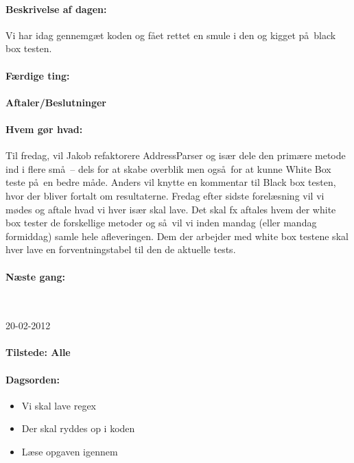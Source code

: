 \documentclass[a4paper,10pt,titlepage]{article}
\begin{document}
			\paragraph{Beskrivelse af dagen:}
			Vi har idag gennemg\ae t koden og f\aa et rettet en smule i den og kigget p\aa \ black box testen.
			
			\paragraph{F\ae rdige ting:}
			
			\paragraph{Aftaler/Beslutninger}
			
			\paragraph{Hvem g\o r hvad:}
			Til fredag, vil Jakob refaktorere AddressParser og is\ae r dele den prim\ae re metode ind i flere sm\aa \ – dels for at skabe overblik men ogs\aa \ for at kunne White Box teste p\aa \ en bedre m\aa de.
Anders vil knytte en kommentar til Black box testen, hvor der bliver fortalt om resultaterne.
Fredag efter sidste forel\ae sning vil vi m\o des og aftale hvad vi hver is\ae r skal lave. Det skal fx aftales hvem der white box tester de forskellige metoder og s\aa \ vil vi inden mandag (eller mandag formiddag) samle hele afleveringen.
Dem der arbejder med white box testene skal hver lave en forventningstabel til den de aktuelle tests.

			\paragraph{N\ae ste gang:}\mbox{}\\
			
			\begin{center}
		20-02-2012
		\end{center}
		\paragraph{Tilstede: Alle}
		\paragraph{Dagsorden:}
		\begin{itemize}
					\item Vi skal lave regex 
					\item Der skal ryddes op i koden
					\item L\ae se opgaven igennem
					 
		\end{itemize}
		
\end{document}
